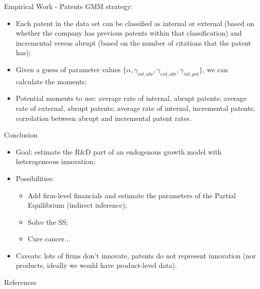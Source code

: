 \documentclass[11pt]{beamer}
\begin{document}
\begin{frame}{Empirical Work - Patents}
GMM strategy:
	\begin{itemize}\itemsep12pt	
		\item Each patent in the data set can be classified as internal or external (based on whether the company has previous patents within that classification) and incremental versus abrupt (based on the number of citations that the patent has);
		\item Given a guess of parameter values $\{\alpha, \gamma_{int, abr}, \gamma_{ext,abr},\gamma_{int, pot}\}$, we can calculate the moments;
		\item Potential moments to use: average rate of internal, abrupt patents; average rate of external, abrupt patents; average rate of internal, incremental patents; correlation between abrupt and incremental patent rates.
	\end{itemize}
\end{frame}

\begin{frame}{Conclusion}
\begin{itemize}\itemsep12pt	
		\item Goal: estimate the R\&D part of an endogenous growth model with heterogeneous innovation;
		\item Possibilities: 
		\begin{itemize}\itemsep12pt
			\item Add firm-level financials and estimate the parameters of the Partial Equilibrium (indirect inference);
			\item Solve the SS;
			\item Cure cancer...
		\end{itemize}
		\item Caveats: lots of firms don't innovate, patents do not represent innovation (nor products, ideally we would have product-level data).
	\end{itemize}
\end{frame}

\begin{frame}{References}
	\nocite{*}
	
\end{frame}
\end{document}
